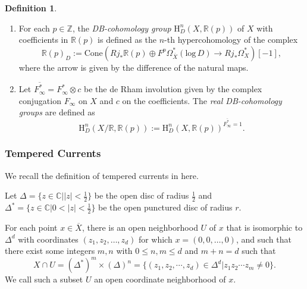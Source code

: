 \documentclass[11pt, a4paper]{amsart}
\theoremstyle{plain}
\theoremstyle{definition}
\newtheorem{definition}[theorem]{Definition}
\numberwithin{equation}{section}
\def\CC{\mathbb{C}}
\def\RR{\mathbb{R}}
\def\ZZ{\mathbb{Z}}
\begin{document}
\begin{definition}
   \begin{enumerate}
       \item For each $p \in \ZZ$, the \textit{DB-cohomology group} $\mathrm{H}_{D}^{n}(X, \RR(p))$ of $X$ with coefficients in $\RR(p)$ is defined as the $n$-th hypercohomology of the complex 
       \begin{equation}
           \RR(p)_{D} := \mathrm{Cone}(Rj_{*}\RR(p) \oplus F^{p}\Omega_{\overline{X}}^{*}(\mathrm{log}\, D) \rightarrow Rj_{*} \Omega_{X}^{*})[-1], 
       \end{equation}
       where the arrow is given by the difference of the natural maps. 
       \item Let $\overline{F^{*}_{\infty}} = F_{\infty}^{*} \otimes c$ be the de Rham involution given by the complex conjugation $F_{\infty}$ on $X$ and $c$ on the coefficients. The \textit{real DB-cohomology groups} are defined as 
       \begin{equation}
           \mathrm{H}_{D}^{n}(X/\RR, \RR(p)) := \mathrm{H}_{D}^{n}(X, \RR(p))^{\overline{F_{\infty}^{*}} = 1}. 
       \end{equation}
   \end{enumerate}
\end{definition}    

\subsubsection{Tempered Currents}
We recall the definition of tempered currents in \cite{BCLRJ24} here. 

Let $\Delta = \{ z \in \CC | |z| < \frac{1}{2} \}$ be the open disc of radius $\frac{1}{2}$ and $\Delta^{*} = \{z \in \CC | 0 < |z| < \frac{1}{2} \}$ be the open punctured disc of radius $r$. 

\par For each point $x \in \overline{X}$, there is an open neighborhood $U$ of $x$ that is isomorphic to $\Delta^{d}$ with coordinates $(z_1, z_2, \ldots, z_{d})$ for which $x = (0, 0, \ldots, 0)$, and such that there exist some integers $m, n$ with $0 \le n, m \le d$ and $m + n = d$ such that 
\begin{equation*}
    X \cap U = (\Delta^{*})^{m} \times (\Delta)^{n} = \{ (z_1, z_2, \cdots, z_{d}) \in \Delta^{d} | z_1 z_2 \cdots z_{m} \neq 0 \}.
\end{equation*}
We call such a subset $U$ an open coordinate neighborhood of $x$. 
\end{document}
